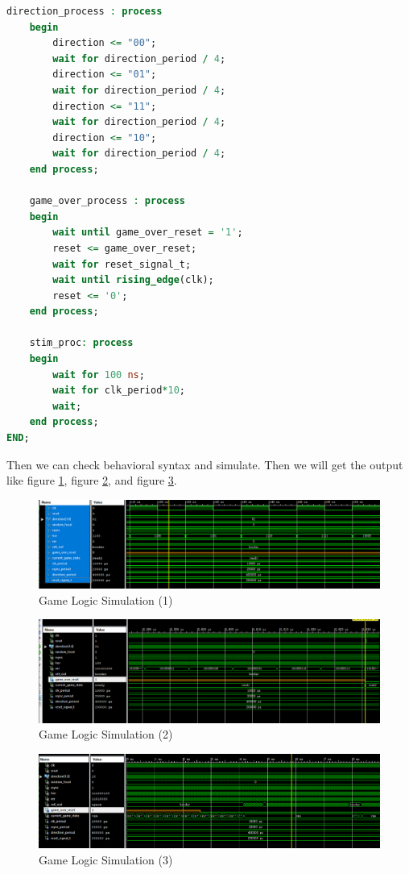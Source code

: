 \documentclass{article}
\begin{document}
\begin{lstlisting}[language=VHDL,caption=Game Logic Unit Test Bench]
    direction_process : process
    begin
        direction <= "00";
        wait for direction_period / 4;
        direction <= "01";
        wait for direction_period / 4;
        direction <= "11";
        wait for direction_period / 4;
        direction <= "10";
        wait for direction_period / 4;
    end process;
    
    game_over_process : process
    begin
        wait until game_over_reset = '1';
        reset <= game_over_reset;
        wait for reset_signal_t;
        wait until rising_edge(clk);
        reset <= '0';
    end process;
    
    stim_proc: process
    begin		
        wait for 100 ns;	
        wait for clk_period*10;
        wait;
    end process;
END;
    \end{lstlisting}
    
    Then we can check behavioral syntax and simulate. Then we will get the output like 
    figure \ref{fig:homework3-7}, figure \ref{fig:homework3-8}, and figure \ref{fig:homework3-9}.
    
    \begin{figure}[h]
\centering
\includegraphics[width=1\linewidth]{homework3-7}
\caption{Game Logic Simulation (1)}
\label{fig:homework3-7}
\end{figure}
\begin{figure}[h]
\centering
\includegraphics[width=1\linewidth]{homework3-8}
\caption{Game Logic Simulation (2)}
\label{fig:homework3-8}
\end{figure}
\begin{figure}[h]
\centering
\includegraphics[width=0.7\linewidth]{homework3-9}
\caption{Game Logic Simulation (3)}
\label{fig:homework3-9}
\end{figure}


    
\end{document}
